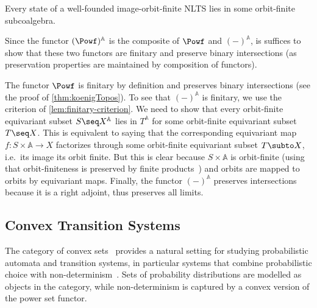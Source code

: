 \documentclass[a4paper,UKenglish, autoref, numberwithinsect, final]{lipics-v2021}
\numberwithin{equation}{section}
\newenvironment{proofhere}[2][Proof of]{%
  \proof{#1~\autoref{#2}}%
}{%
  \endproof%
  \par%
}
\newenvironment{proofappendix}[2][Proof of]{%
    \begin{proofhere}[#1]{#2}
  }{%
    \end{proofhere}
  }
\theoremstyle{plain}
\theoremstyle{definition}
\newcommand{\At}{\mathbb{A}}
\begin{document}
\begin{theorem}\label{thm:koenigNomGraph}
  Every state of a well-founded image-orbit-finite NLTS lies in some orbit-finite subcoalgebra.
\end{theorem}
\begin{proofappendix}{thm:koenigNomGraph}
Since the functor $(\Powf)^\At$ is the composite of $\Powf$ and $(-)^\At$, is suffices to show that these two functors are finitary and preserve binary intersections (as preservation properties are maintained by composition of functors).

The functor $\Powf$ is finitary by definition and preserves binary intersections (see the proof of \autoref{thm:koenigTopos}). To see that $(-)^\At$ is finitary, we use the criterion of \autoref{lem:finitary-criterion}. We need to show that every orbit-finite equivariant subset $S\seq X^\At$ lies in $T^\At$ for some orbit-finite equivariant subset $T\seq X$. This is equivalent to saying that the corresponding equivariant map $f\colon S\times \At \to X$ factorizes through some orbit-finite equivariant subset $T\subto X$, i.e.\ its image its orbit finite. But this is clear because $S\times \At$ is orbit-finite (using that orbit-finiteness is preserved by finite products~\cite{pitts13}) and orbits are mapped to orbits by equivariant maps. Finally, the functor $(-)^\At$ preserves intersections because it is a right adjoint, thus preserves all limits.   
\end{proofappendix}

\subsection{Convex Transition Systems}
\label{sec:convex}
The category of {convex sets}~\cite{stone-49} provides a natural setting for studying probabilistic automata and transition systems, in particular systems that combine probabilistic choice with non-determinism~\cite{bss17,mv20,msv21,bsv22}. Sets of probability distributions are modelled as objects in the category, while non-determinism is captured by a convex version of the power set functor. 
\end{document}
